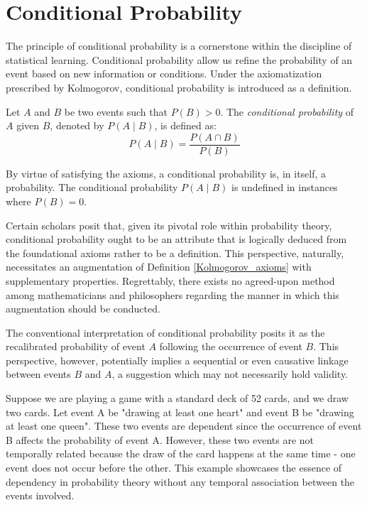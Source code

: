 %
%

\section{Conditional Probability}
\label{sec:probability_conditional}

The principle of conditional probability is a cornerstone within the discipline of statistical learning. Conditional probability allow us refine the probability of an event based on new information or conditions. Under the axiomatization prescribed by Kolmogorov, conditional probability is introduced as a definition.

\begin{definition}
Let $A$ and $B$ be two events such that $P \left( B \right) > 0$. The \emph{conditional probability} of $A$ given $B$, denoted by $P \left( A \mid B \right)$, is defined as:
\[
P\left(A\mid B\right) = \frac{P\left(A\cap B\right)}{P\left(B\right)}
\]
\end{definition}

By virtue of satisfying the axioms, a conditional probability is, in itself, a probability. The conditional probability $P\left(A\mid B\right)$ is undefined in instances where $P\left(B\right)=0$.

Certain scholars posit that, given its pivotal role within probability theory, conditional probability ought to be an attribute that is logically deduced from the foundational axioms rather to be a definition. This perspective, naturally, necessitates an augmentation of Definition \ref{Kolmogorov_axioms} with supplementary properties. Regrettably, there exists no agreed-upon method among mathematicians and philosophers regarding the manner in which this augmentation should be conducted.

The conventional interpretation of conditional probability posits it as the recalibrated probability of event $A$ following the occurrence of event $B$. This perspective, however, potentially implies a sequential or even causative linkage between events $B$ and $A$, a suggestion which may not necessarily hold validity.

\begin{example}
\label{ex:concurrent_events}
Suppose we are playing a game with a standard deck of 52 cards, and we draw two cards. Let event A be "drawing at least one heart" and event B be "drawing at least one queen". These two events are dependent since the occurrence of event B affects the probability of event A. However, these two events are not temporally related because the draw of the card happens at the same time - one event does not occur before the other. This example showcases the essence of dependency in probability theory without any temporal association between the events involved.
\end{example}

